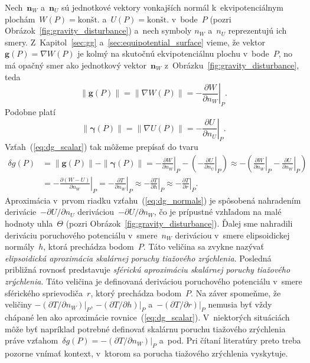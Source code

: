 \documentclass[a4paper, 12pt]{book}
\let\vec\mathbf
\begin{document}
Nech~$\vec n_W$ a~$\vec n_U$ sú jednotkové vektory vonkajších normál 
k~ekvipotenciálnym plochám~$W(P) = \textrm{konšt.}$ a~$U(P) = \textrm{konšt.}$ 
v~bode~$P$ (pozri Obrázok~\ref{fig:gravity_disturbance}) a~nech symboly $n_W$ 
a~$n_U$ reprezentujú ich smery.  Z~Kapitol~\ref{sec:gg} 
a~\ref{sec:equipotential_surface} vieme, že vektor~$\vec g(P) = \nabla W(P)$ je 
kolmý na skutočnú ekvipotenciálnu plochu v~bode~$P$, no má opačný smer ako 
jednotkový vektor~$\vec n_W$ z~Obrázku~\ref{fig:gravity_disturbance}, teda
%
\begin{equation}
\| \vec g(P) \| = \| \nabla W(P) \| = -\left.\frac{\partial W}{\partial 
n_W}\right|_P.
\end{equation}
%
Podobne platí
%
\begin{equation}
\| \boldsymbol \gamma(P) \| = \| \nabla U(P) \| = -\left.\frac{\partial 
U}{\partial n_U}\right|_P.
\end{equation}
%
Vzťah~(\ref{eq:dg_scalar}) tak môžeme prepísať do tvaru
%
\begin{equation}
\label{eq:dg_normals}
\begin{split}
\delta g(P) &= \| \vec g(P) \| - \| \boldsymbol\gamma(P) \| 
= -\left.\frac{\partial W}{\partial n_W}\right|_P - \left( 
- \left.\frac{\partial U}{\partial n_U}\right|_P\right) \approx -\left( 
\left.\frac{\partial W}{\partial n_W}\right|_P - \left.\frac{\partial 
U}{\partial n_W}\right|_P\right)\\
%
&= -\left.\frac{\partial (W - U)}{\partial n_W}\right|_P 
=  -\left.\frac{\partial T}{\partial n_W}\right|_P \approx 
-\left.\frac{\partial T}{\partial h}\right|_P \approx -\left.\frac{\partial 
T}{\partial r}\right|_P{.}
\end{split}
\end{equation}
%
Aproximácia v~prvom riadku vzťahu~(\ref{eq:dg_normals}) je spôsobená nahradením 
derivácie~$-\partial U \slash \partial n_U$ deriváciou~$-\partial U \slash 
\partial n_W$, čo je prípustné vzhľadom na malé hodnoty uhla~$\Theta$ (pozri 
Obrázok~\ref{fig:gravity_disturbance}).  Ďalej sme nahradili deriváciu 
poruchového potenciálu v~smere~$n_W$ deriváciou v~smere elipsoidickej 
normály~$h$, ktorá prechádza bodom~$P$.  Táto veličina sa zvykne nazývať 
\emph{elipsoidická aproximácia skalárnej poruchy tiažového zrýchlenia}.  
Posledná približná rovnosť predstavuje \emph{sférickú aproximáciu skalárnej 
poruchy tiažového zrýchlenia}.  Táto veličina je definovaná deriváciou 
poruchového potenciálu v~smere sférického sprievodiča~$r$, ktorý prechádza 
bodom~$P$.  Na záver spomeňme, že veličiny $-\left(\partial T \slash \partial 
n_W\right)|_P$, $-\left(\partial T \slash \partial h\right)|_P$ 
a~$-\left(\partial T \slash \partial r\right)|_P$ nemusia byť vždy chápané len 
ako aproximácie rovnice~(\ref{eq:dg_scalar}).  V~niektorých situáciách môže byť 
napríklad potrebné definovať skalárnu poruchu tiažového zrýchlenia práve 
vzťahom~$\delta g(P) = -\left(\partial T \slash \partial n_W\right)|_P$ a~pod.  
Pri čítaní literatúry preto treba pozorne vnímať kontext, v~ktorom sa porucha 
tiažového zrýchlenia vyskytuje.
\end{document}
